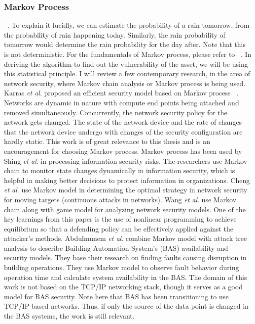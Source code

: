 \subsubsection{Markov Process}\label{sec:markov_process}
 ~\cite{MarkovPr80:online}. To explain it lucidly, we can estimate the probability of a rain tomorrow, from the probability of rain happening today. Similarly, the rain probability of tomorrow would determine the rain probability for the day after. Note that this is not deterministic. For the fundamentals of Markov process, please refer to ~\cite{5312000}. In deriving the algorithm to find out the vulnerability of the asset, we will be using this statistical principle. I will review a few contemporary research, in the area of network security, where Markov chain analysis or Markov process is being used.\\
Karras \textit{et al}. proposed an efficient security model based on Markov process ~\cite{4689126}. Networks are dynamic in nature with compute end points being attached and removed simultaneously. Concurrently, the network security policy for the network gets changed. The state of the network device and the rate of changes that the network device undergo with changes of the security configuration are hardly static. This work is of great relevance to this thesis and is an encouragement for choosing Markov process. Markov process has been used by Shing \textit{et al}. in processing information security risks. The researchers use Markov chain to monitor state changes dynamically in information security, which is helpful in making better decisions to protect information in organizations. Cheng \textit{et al}. use Markov model in determining the optimal strategy in network security for moving targets (continuous attacks in networks). Wang \textit{et al}. use Markov chain along with game model for analyzing network security models. One of the key learnings from this paper is the use of nonlinear programming to achieve equilibrium so that a defending policy can be effectively applied against the attacker's methods. Abdulmunem \textit{et al}. combine Markov model with attack tree analysis to describe Building Automation System's (BAS) availability and security models. They base their research on finding faults causing disruption in building operations. They use Markov model to observe fault behavior during operation time and calculate system availability in the BAS. The domain of this work is not based on the TCP/IP networking stack, though it serves as a good model for BAS security. Note here that BAS has been transitioning to use TCP/IP based networks. Thus, if only the source of the data point is changed in the BAS systems, the work is still relevant.

